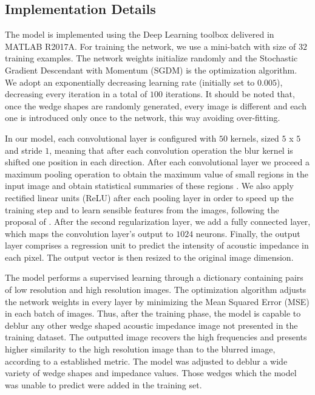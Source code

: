 \documentclass[conference,compsoc]{IEEEtran}
\begin{document}
\subsection{Implementation Details}
The model is implemented using the Deep Learning toolbox
delivered in MATLAB R2017A. For training the network, we use a mini-batch with size of $32$ training examples.
The network weights initialize randomly and the Stochastic Gradient Descendant with
Momentum (SGDM) \cite{Ning} is the optimization algorithm.
We adopt an exponentially decreasing learning rate (initially
set to $0.005$), decreasing every iteration in a total of $100$ iterations.
It should be noted that, once the wedge shapes are randomly generated, every image is different
and each one is introduced only once to the network, this way avoiding over-fitting.

In our model, each convolutional layer is configured with $50$ kernels, sized $5$ x $5$
and stride $1$, meaning that after each convolution operation the blur kernel is shifted
one position in each direction. After each convolutional layer we proceed a maximum pooling operation
to obtain the maximum value of small regions in the input image and obtain  statistical summaries of these regions . We also
apply rectified linear units (ReLU) after each pooling layer in order to speed up the training
step and to learn sensible features from the images, following the proposal of \cite{Nair2010}. After
the second regularization layer,  we add a fully connected layer, which maps the convolution layer's output
to $1024$ neurons. Finally, the output layer comprises a regression unit to predict the intensity of acoustic impedance in each pixel.
The output vector is then resized to the original image dimension.

The model performs a supervised learning through a dictionary containing pairs of low resolution and high resolution images.
The optimization algorithm adjusts the network weights in every layer by minimizing the Mean Squared Error (MSE)
in each batch of images. Thus, after the training phase, the model is capable
to deblur any other wedge shaped acoustic impedance image not presented in the training dataset. The outputted
image recovers the high frequencies and presents higher similarity
to the high resolution image than to the blurred image, according to a established metric.
The model was adjusted to deblur a wide variety of wedge shapes and impedance values.
Those wedges which the model was unable to predict were added in the training set.
\end{document}
